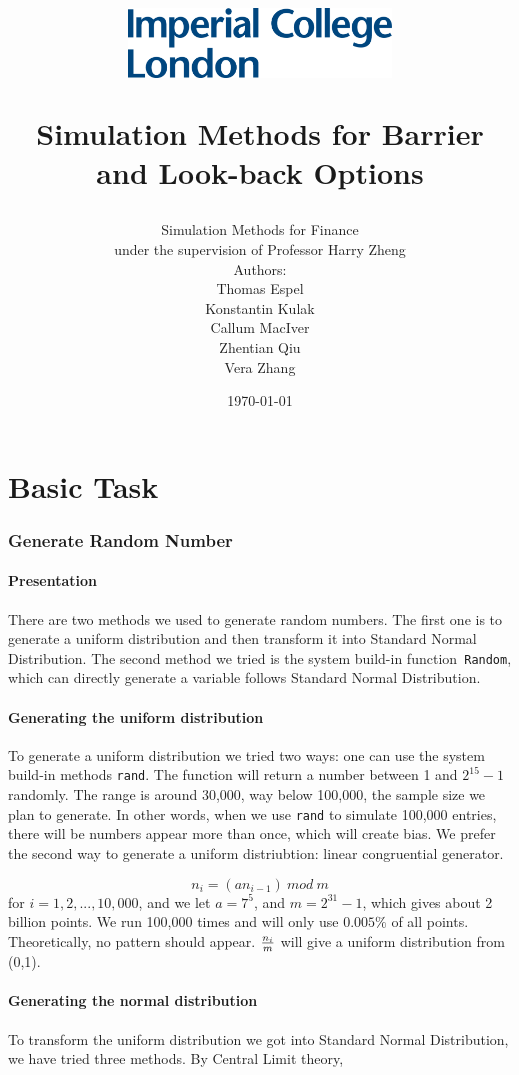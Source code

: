 \documentclass[11pt,a4paper,fleqn]{article}
\author{{\LARGE Simulation Methods for Finance}\\under the supervision of Professor Harry Zheng
\\[5cm] Authors:\\
Thomas Espel\\ Konstantin Kulak\\ Callum MacIver\\Zhentian Qiu\\Vera Zhang\\[6.5cm]}
\title{\vspace*{-2cm}\begin{flushleft}\includegraphics[width=7cm]{imperial.png}\end{flushleft}
\vspace*{4cm}
\Huge\sffamily Simulation Methods for Barrier and Look-back Options}
\date{\sffamily\today}
\begin{document}
\maketitle
\thispagestyle{empty}

\newpage
\tableofcontents
\newpage
\setcounter{page}{1}

\part{Basic Task}
\section{Generate Random Number}
\subsection{Presentation}
There are two methods we used to generate random numbers.
The first one is to generate a uniform distribution and then transform it into Standard Normal Distribution. The second method we tried is the system build-in function\texttt{ Random}, which can directly generate a variable follows Standard Normal Distribution.
\subsection{Generating the uniform distribution}
To generate a uniform distribution we tried two ways: one can use the system build-in methods \texttt{rand}. The function will return a number between 1 and $2^{15} -1$ randomly. The range is around 30,000, way below 100,000, the sample size we plan to generate. In other words, when we use \texttt{rand} to simulate 100,000 entries, there will be numbers appear more than once, which will create bias. We prefer the second way to generate a uniform distriubtion: linear congruential generator.

$$n_i = (an_{i-1}) \ mod\ m$$for $i=1,2,...,10,000$, and we let $ a = 7^5$, and $m = 2^{31}-1$, which gives about 2 billion points. We run 100,000 times and will only use $0.005\%$ of all points. Theoretically, no pattern should appear. ${n_i \over m}$ will give a uniform distribution from (0,1).
\subsection{Generating the normal distribution}
To transform the uniform distribution we got into Standard Normal Distribution, we have tried three methods. By Central Limit theory,
\end{document}
